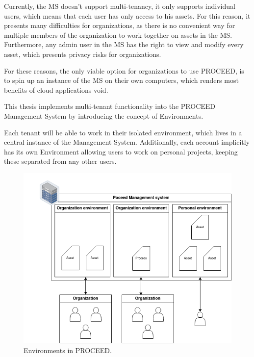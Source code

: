 Currently, the MS doesn't support multi-tenancy, it only supports individual users, which means that each user has only access to his assets.
For this reason, it presents many difficulties for organizations, as there is no convenient way for multiple members of the organization to work together on assets in the MS.
Furthermore, any admin user in the MS has the right to view and modify every asset, which presents privacy risks for organizations.

For these reasons, the only viable option for organizations to use PROCEED, is to spin up an instance of the MS on their own computers, which renders most benefits of cloud applications void.

This thesis implements multi-tenant functionality into the PROCEED Management System by introducing the concept of Environments. 

Each tenant will be able to work in their isolated environment, which lives in a central instance of the Management System. 
Additionally, each account implicitly has its own Environment allowing users to work on personal projects, keeping these separated from any other users.

\begin{figure}[H]
    \centering
    \includegraphics[scale=0.6]{images/proceed-workspaces-v2.drawio.png}
    \caption{Environments in PROCEED.}
    \label{fig:proceed-envitonments-overview}
\end{figure}

